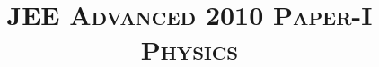 \documentclass{article}
\title{\textsc{JEE Advanced 2010 Paper-I\\Physics}}
\date{}
\begin{document}
\maketitle
\begin{enumerate}
    
    
    
    
    
    
    
    
    
    
    
    
    
    
    
    
    
    
    
    
    
    
    
    
    
\end{enumerate}
\end{document}
